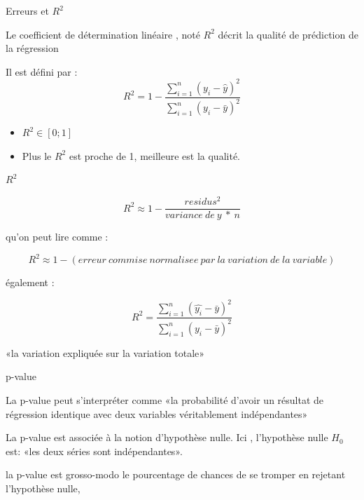 \documentclass{beamer}
\begin{document}
\begin{frame}{Erreurs et  $R^2$}


Le \alert{coefficient de détermination linéaire} ,  noté $R^2$   décrit la \alert{qualité de prédiction} de la régression


Il est défini par : 
 $$R^2  = 1 - \frac{\sum_{i=1}^{n} (y_i - \hat{y})^2}{\sum_{i=1}^{n} (y_i - \bar{y})^2}$$


\begin{itemize}
\item $R^2 \in [0;1]$
\item Plus le $R^2$ est proche de 1, meilleure est la qualité.
\end{itemize}


\end{frame}





\begin{frame}{$R^2$}




$$R^2 \approx 1- \frac{residus^2}{variance\ de\ y\ *\ n}$$

qu'on peut lire comme : 

$$R^2 \approx 1- (erreur\ commise\ normalisee\ par\ la\ variation\ de\ la\ variable )$$

également :

$$R^2  =  \frac{\sum_{i=1}^{n} (\hat{y_i} -\bar{y} )^2}{\sum_{i=1}^{n} (y_i - \bar{y})^2}$$

«la variation expliquée  sur la variation totale»


\end{frame}







\begin{frame}[fragile]{ p-value}


La p-value peut s'interpréter comme «la probabilité d'avoir un résultat de régression identique avec deux variables véritablement indépendantes» 



La p-value est associée à la notion d'\alert{hypothèse nulle}. 
Ici , l'hypothèse nulle $H_0$ est: «les deux séries sont indépendantes». 

la p-value est grosso-modo le  \alert{pourcentage de chances de se tromper} en rejetant l'hypothèse nulle, 


\end{frame}
\end{document}
